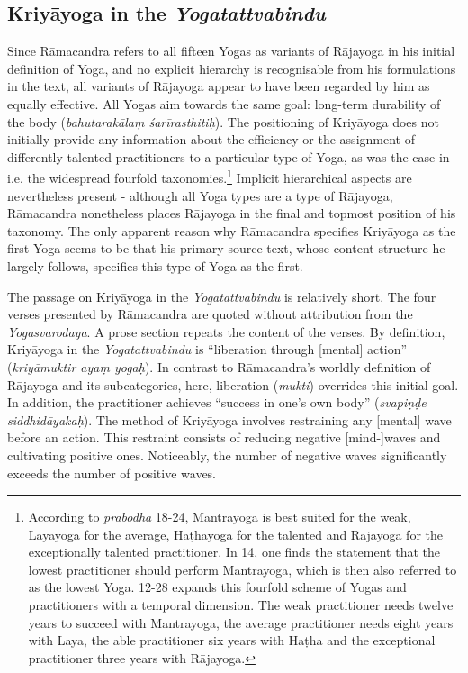 \subsection{Kriyāyoga in the \textit{Yogatattvabindu}}
\label{kriyaintro}
Since Rāmacandra refers to all fifteen Yogas as variants of Rājayoga in his initial definition of Yoga, and no explicit hierarchy is recognisable from his formulations in the text, all variants of Rājayoga appear to have been regarded by him as equally effective. All Yogas aim towards the same goal: long-term durability of the body (\textit{bahutarakālaṃ śarīrasthitiḥ}). The positioning of Kriyāyoga does not initially provide any information about the efficiency or the assignment of differently talented practitioners to a particular type of Yoga, as was the case in i.e. the widespread fourfold taxonomies.\footnote{According to \textit{prabodha} 18-24, Mantrayoga is best suited for the weak, Layayoga for the average, Haṭhayoga for the talented and Rājayoga for the exceptionally talented practitioner. In  14, one finds the statement that the lowest practitioner should perform Mantrayoga, which is then also referred to as the lowest Yoga.  12-28 expands this fourfold scheme of Yogas and practitioners with a temporal dimension. The weak practitioner needs twelve years to succeed with Mantrayoga, the average practitioner needs eight years with Laya, the able practitioner six years with Haṭha and the exceptional practitioner three years with Rājayoga.} Implicit hierarchical aspects are nevertheless present - although all Yoga types are a type of Rājayoga, Rāmacandra nonetheless places Rājayoga in the final and topmost position of his taxonomy.
The only apparent reason why Rāmacandra specifies Kriyāyoga as the first Yoga seems to be that his primary source text, whose content structure he largely follows, specifies this type of Yoga as the first.

The passage on Kriyāyoga in the \textit{Yogatattvabindu} is relatively short. The four verses presented by Rāmacandra are quoted without attribution from the \textit{Yogasvarodaya}. A prose section repeats the content of the verses. By definition, Kriyāyoga in the \textit{Yogatattvabindu} is ``liberation through [mental] action'' (\textit{kriyāmuktir ayaṃ yogaḥ}). In contrast to Rāmacandra's worldly definition of Rājayoga and its subcategories, here, liberation (\textit{mukti}) overrides this initial goal. In addition, the practitioner achieves ``success in one's own body'' (\textit{svapiṇḍe siddhidāyakaḥ}). The method of Kriyāyoga involves restraining any [mental] wave before an action. This restraint consists of reducing negative [mind-]waves and cultivating positive ones. Noticeably, the number of negative waves significantly exceeds the number of positive waves.

